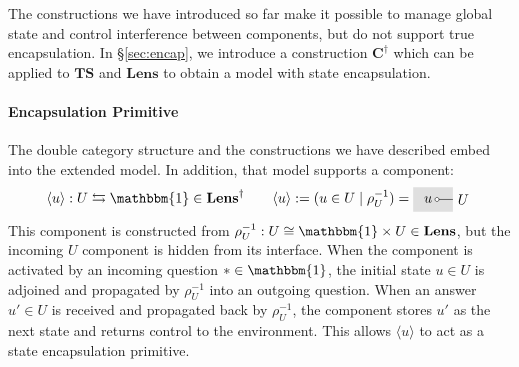 \documentclass[acmsmall,screen,review,anonymous]{acmart}
\newcommand{\lensarrow}{\leftrightarrows}
\begin{document}
The constructions we have introduced so far
make it possible to manage global state
and control interference between components,
but do not support true encapsulation.
In \S\ref{sec:encap},
%
%
we introduce a construction $\mathbf{C}^\dagger$
which can be applied to $\mathbf{TS}$ and $\mathbf{Lens}$
to obtain a model with state encapsulation.


\paragraph{Encapsulation Primitive}

The double category structure
and the constructions we have described
embed into the extended model.
In addition,
that model supports a component:
\[
  \langle u \rangle : U \lensarrow \mathbbm{1} \in \mathbf{Lens}^\dagger
  \qquad
  \langle u \rangle := (u \in U \mid \rho^{-1}_U)
  =
  \begin{tikzpicture}[xscale=0.4,yscale=0.3,baseline=(u.base)]
    \fill[tssdbg] (-1.5,-1) rectangle (1,1);
    \draw (0,0)
      node[draw,fill=white,circle,inner sep=1pt] {}
      node[left] (u) {$u$}
      -- (1,0) node[right]{$U$};
  \end{tikzpicture}
\]
This component is constructed from
$\rho^{-1}_U : U \cong \mathbbm{1} \times U \in \mathbf{Lens}$,
but the incoming $U$ component is hidden from its interface.
When the component is activated
by an incoming question $* \in \mathbbm{1}$,
the initial state $u \in U$ is adjoined
and propagated by $\rho^{-1}_U$ into an outgoing question.
When an answer $u' \in U$ is received
and propagated back by $\rho^{-1}_U$,
the component stores $u'$ as the next state and returns control to the environment.
This allows $\langle u \rangle$ to act
as a state encapsulation primitive.
\end{document}
